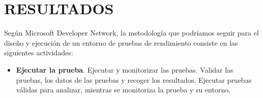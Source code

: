 \chapter{RESULTADOS\label{sec:resultados}}

\clearpage

Según Microsoft Developer Network, la metodología que podríamos seguir para el diseño y ejecución de un entorno de pruebas de rendimiento consiste en las siguientes actividades:

\begin{itemize}
  \item \textbf{Ejecutar la prueba}. Ejecutar y monitorizar las pruebas. Validar las pruebas, los datos de las pruebas y recoger los resultados. Ejecutar pruebas válidas para analizar, mientras se monitoriza la prueba y su entorno.
\end{itemize}

